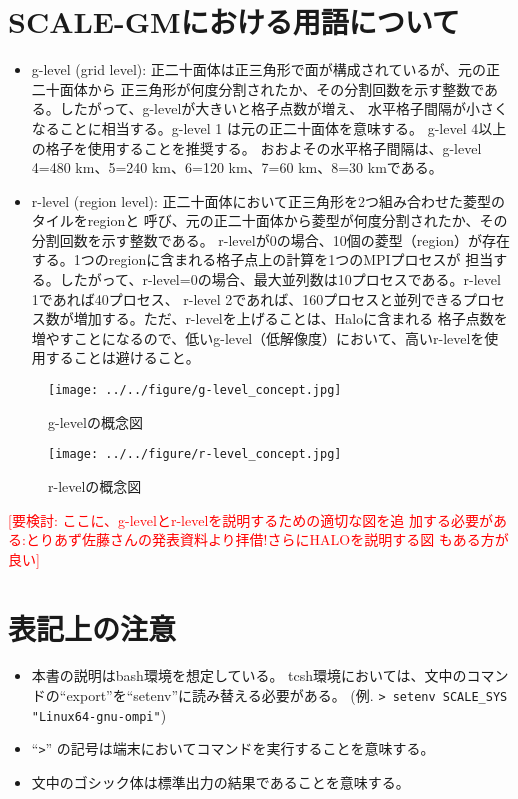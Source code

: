 \section{SCALE-GMにおける用語について}

 \begin{itemize}
   \item g-level (grid level): 正二十面体は正三角形で面が構成されているが、元の正二十面体から
正三角形が何度分割されたか、その分割回数を示す整数である。したがって、g-levelが大きいと格子点数が増え、
水平格子間隔が小さくなることに相当する。g-level 1 は元の正二十面体を意味する。
g-level 4以上の格子を使用することを推奨する。
おおよその水平格子間隔は、g-level 4=480 km、5=240 km、6=120 km、7=60 km、8=30 kmである。
   \item r-level (region level): 正二十面体において正三角形を2つ組み合わせた菱型のタイルをregionと
呼び、元の正二十面体から菱型が何度分割されたか、その分割回数を示す整数である。
r-levelが0の場合、10個の菱型（region）が存在する。1つのregionに含まれる格子点上の計算を1つのMPIプロセスが
担当する。したがって、r-level=0の場合、最大並列数は10プロセスである。r-level 1であれば40プロセス、
r-level 2であれば、160プロセスと並列できるプロセス数が増加する。ただ、r-levelを上げることは、Haloに含まれる
格子点数を増やすことになるので、低いg-level（低解像度）において、高いr-levelを使用することは避けること。
 \end{itemize}

\begin{figure}[H]
\centering
\texttt{[image: ../../figure/g-level\_concept.jpg]}
\caption{g-levelの概念図}
\centering
\texttt{[image: ../../figure/r-level\_concept.jpg]}
\caption{r-levelの概念図}
\end{figure}

\textcolor{red}{[要検討: ここに、g-levelとr-levelを説明するための適切な図を追
    加する必要がある:とりあず佐藤さんの発表資料より拝借!さらにHALOを説明する図
    もある方が良い]}


\section{表記上の注意}
 \begin{itemize}
   \item 本書の説明はbash環境を想定している。
         tcsh環境においては、文中のコマンドの``export''を``setenv''に読み替える必要がある。
         (例. \verb|> setenv SCALE_SYS "Linux64-gnu-ompi"|)
   \item ``\verb|>|'' の記号は端末においてコマンドを実行することを意味する。
   \item 文中のゴシック体は標準出力の結果であることを意味する。
 \end{itemize}

